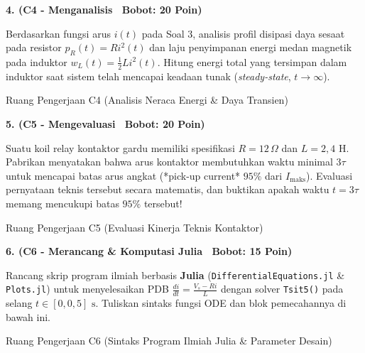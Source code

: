 \documentclass[10pt,a4paper]{article}
\begin{document}
\noindent\textbf{4. (C4 - Menganalisis \textbar\ Bobot: 20 Poin)}\par\vspace{0.5mm}
{\footnotesize Berdasarkan fungsi arus $i(t)$ pada Soal 3, analisis profil disipasi daya sesaat pada resistor $p_R(t) = R i^2(t)$ dan laju penyimpanan energi medan magnetik pada induktor $w_L(t) = \frac{1}{2} L i^2(t)$. Hitung energi total yang tersimpan dalam induktor saat sistem telah mencapai keadaan tunak (\textit{steady-state}, $t \to \infty$).}
\begin{answerbox}{Ruang Pengerjaan C4 (Analisis Neraca Energi \& Daya Transien)}
  \vspace{3.8cm}
\end{answerbox}

\vspace{1.5mm}

\noindent\textbf{5. (C5 - Mengevaluasi \textbar\ Bobot: 20 Poin)}\par\vspace{0.5mm}
{\footnotesize Suatu koil relay kontaktor gardu memiliki spesifikasi $R = 12\,\Omega$ dan $L = 2{,}4\text{ H}$. Pabrikan menyatakan bahwa arus kontaktor membutuhkan waktu minimal $3\tau$ untuk mencapai batas arus angkat (*pick-up current* $95\%$ dari $I_{\text{maks}}$). Evaluasi pernyataan teknis tersebut secara matematis, dan buktikan apakah waktu $t = 3\tau$ memang mencukupi batas $95\%$ tersebut!}
\begin{answerbox}{Ruang Pengerjaan C5 (Evaluasi Kinerja Teknis Kontaktor)}
  \vspace{3.8cm}
\end{answerbox}

\vspace{1.5mm}

\noindent\textbf{6. (C6 - Merancang \& Komputasi Julia \textbar\ Bobot: 15 Poin)}\par\vspace{0.5mm}
{\footnotesize Rancang skrip program ilmiah berbasis \textbf{Julia} (\texttt{Differential\-Equations.jl} \& \texttt{Plots.jl}) untuk menyelesaikan PDB $\frac{di}{dt} = \frac{V_s - R i}{L}$ dengan solver \texttt{Tsit5()} pada selang $t \in [0, 0{,}5]\text{ s}$. Tuliskan sintaks fungsi ODE dan blok pemecahannya di bawah ini.}
\begin{answerbox}{Ruang Pengerjaan C6 (Sintaks Program Ilmiah Julia \& Parameter Desain)}
  \vspace{3.8cm}
\end{answerbox}
\end{document}
